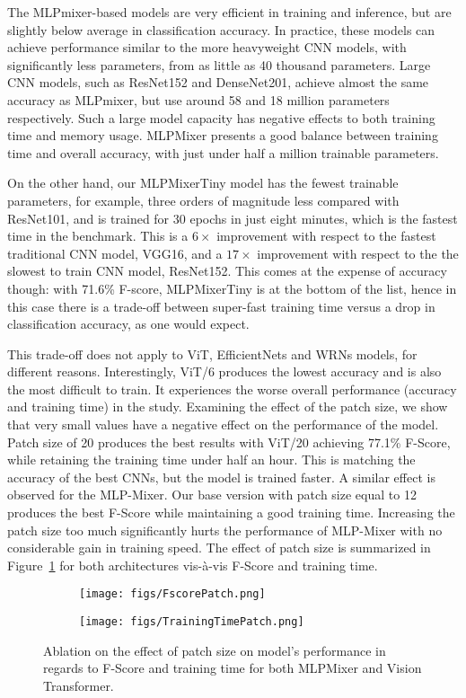 \documentclass[journal]{IEEEtran}
\begin{document}
The MLPmixer-based models are very efficient in training and inference, but are slightly below average in classification accuracy. In practice, these models can achieve performance similar to the more heavyweight CNN models, with significantly less parameters, from as little as 40 thousand parameters. Large CNN models, such as ResNet152 and DenseNet201, achieve almost the same accuracy as MLPmixer, but use around 58 and 18 million parameters respectively. Such a large model capacity has negative effects to both training time and memory usage. MLPMixer presents a good balance between training time and overall accuracy, with just under half a million trainable parameters. 

On the other hand, our MLPMixerTiny model has the fewest trainable parameters, for example, three orders of magnitude less compared with ResNet101, and is trained for 30 epochs in just eight minutes, which is the fastest time in the benchmark. This is a $6\times$ improvement with respect to the fastest traditional CNN model, VGG16, and a $17\times$ improvement with respect to the the slowest to train CNN model, ResNet152. This comes at the expense of accuracy though: with 71.6\% F-score, MLPMixerTiny is at the bottom of the list, hence in this case there is a trade-off between super-fast training time versus a drop in classification accuracy, as one would expect. 


This trade-off does not apply to ViT, EfficientNets and WRNs models, for different reasons. Interestingly, ViT/6 produces the lowest accuracy and is also the most difficult to train. It experiences the worse overall performance (accuracy and training time) in the study. Examining the effect of the patch size, we show that very small values have a negative effect on the performance of the model. Patch size of 20 produces the best results with ViT/20 achieving 77.1\% F-Score, while retaining the training time under half an hour. This is matching the accuracy of the best CNNs, but the model is trained faster. A similar effect is observed for the MLP-Mixer. Our base version with patch size equal to 12 produces the best F-Score while maintaining a good training time. Increasing the patch size too much significantly hurts the performance of MLP-Mixer with no considerable gain in training speed. The effect of patch size is summarized in Figure~\ref{fig:patch_effect} for both architectures vis-à-vis F-Score and training time.
 
 \begin{figure}[ht]
\begin{subfigure}{0.23\textwidth}
\centering
 \texttt{[image: figs/FscorePatch.png]}
\end{subfigure}
\begin{subfigure}{0.23\textwidth}
\centering
\texttt{[image: figs/TrainingTimePatch.png]}
\end{subfigure}
\caption{Ablation on the effect of patch size on model's performance in regards to F-Score and training time for both MLPMixer and Vision Transformer.}
\label{fig:patch_effect}
\end{figure}
\end{document}
